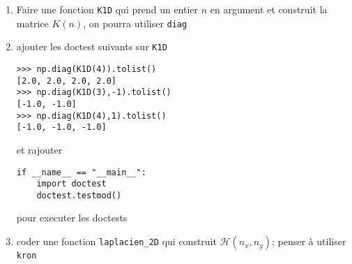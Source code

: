 \documentclass[11pt,a4wide]{article}
\begin{document}
      \begin{enumerate}

        \item Faire une fonction {\tt K1D} qui prend un entier $n$ en argument et construit la matrice $K(n)$, on pourra utiliser {\tt diag}
	\item ajouter les doctest suivants sur {\tt K1D}
	\begin{lstlisting}
>>> np.diag(K1D(4)).tolist()
[2.0, 2.0, 2.0, 2.0]
>>> np.diag(K1D(3),-1).tolist()
[-1.0, -1.0]
>>> np.diag(K1D(4),1).tolist()
[-1.0, -1.0, -1.0]
	\end{lstlisting}
      et rajouter 
    \begin{lstlisting}
if __name__ == "__main__":
    import doctest
    doctest.testmod() 
    \end{lstlisting}
    pour executer les doctests
    \item coder une fonction {\tt laplacien\_2D} qui construit ${\mathcal H}(n_x,n_y)$; penser à utiliser {\tt kron}
                 
     \end{enumerate}
\end{document}
